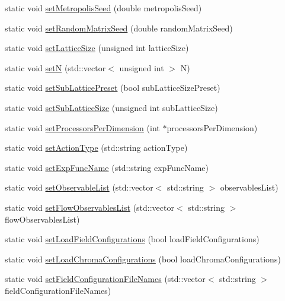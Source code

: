 \begin{DoxyCompactItemize}
static void \mbox{\hyperlink{class_parameters_ace3967a0ee49901f55e9de69e0a96117}{set\+Metropolis\+Seed}} (double metropolis\+Seed)
\item 
static void \mbox{\hyperlink{class_parameters_a46615f8286bd7363ab1f09074fdc6940}{set\+Random\+Matrix\+Seed}} (double random\+Matrix\+Seed)
\item 
static void \mbox{\hyperlink{class_parameters_a5ed3d5d9a08ceecbd3378da54e717794}{set\+Lattice\+Size}} (unsigned int lattice\+Size)
\item 
static void \mbox{\hyperlink{class_parameters_a0e0118ebbe8f19148a5c6d737c7a2c85}{setN}} (std\+::vector$<$ unsigned int $>$ N)
\item 
static void \mbox{\hyperlink{class_parameters_a95d3c7f35ed0421419d98faecb2c23e8}{set\+Sub\+Lattice\+Preset}} (bool sub\+Lattice\+Size\+Preset)
\item 
static void \mbox{\hyperlink{class_parameters_a978f5547036311816f21e3ebe8af77fc}{set\+Sub\+Lattice\+Size}} (unsigned int sub\+Lattice\+Size)
\item 
static void \mbox{\hyperlink{class_parameters_a4c983b1ab17ec51be118792b3a6d17a5}{set\+Processors\+Per\+Dimension}} (int $\ast$processors\+Per\+Dimension)
\item 
static void \mbox{\hyperlink{class_parameters_aa7436b658d07358009b922584798fb6d}{set\+Action\+Type}} (std\+::string action\+Type)
\item 
static void \mbox{\hyperlink{class_parameters_abbcb8f09dfec507ec29caa248819522b}{set\+Exp\+Func\+Name}} (std\+::string exp\+Func\+Name)
\item 
static void \mbox{\hyperlink{class_parameters_a6fb3ff88b2a2c9d5d4f2c3b64e672fa1}{set\+Observable\+List}} (std\+::vector$<$ std\+::string $>$ observables\+List)
\item 
static void \mbox{\hyperlink{class_parameters_ad7a6cb2ff449a75c13df52c786da7b98}{set\+Flow\+Observables\+List}} (std\+::vector$<$ std\+::string $>$ flow\+Observables\+List)
\item 
static void \mbox{\hyperlink{class_parameters_a4f96947340b496b847a808b8be6fc5f9}{set\+Load\+Field\+Configurations}} (bool load\+Field\+Configurations)
\item 
static void \mbox{\hyperlink{class_parameters_a632a2371d7b5d157df2dd42e7b6ab843}{set\+Load\+Chroma\+Configurations}} (bool load\+Chroma\+Configurations)
\item 
static void \mbox{\hyperlink{class_parameters_a4b1c5312603f90d04f1b6ed732528ae3}{set\+Field\+Configuration\+File\+Names}} (std\+::vector$<$ std\+::string $>$ field\+Configuration\+File\+Names)

\end{DoxyCompactItemize}
